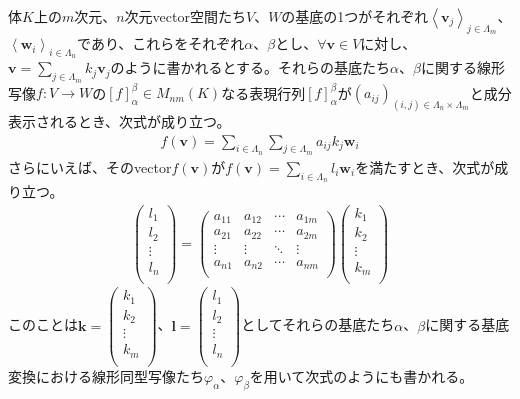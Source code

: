 \documentclass[dvipdfmx]{jsarticle}
\begin{document}
\begin{thm}
\label{2.1.5.5}
体$K$上の$m$次元、$n$次元vector空間たち$V$、$W$の基底の1つがそれぞれ$\left\langle \mathbf{v}_{j} \right\rangle_{j \in \varLambda_{m}}$、$\left\langle \mathbf{w}_{i} \right\rangle_{i \in \varLambda_{n}}$であり、これらをそれぞれ$\alpha$、$\beta$とし、$\forall\mathbf{v} \in V$に対し、$\mathbf{v} = \sum_{j \in \varLambda_{m}} {k_{j}\mathbf{v}_{j}}$のように書かれるとする。それらの基底たち$\alpha$、$\beta$に関する線形写像$f:V \rightarrow W$の$[ f]^{\beta}_{\alpha} \in M_{nm}(K)$なる表現行列$[ f]^{\beta}_{\alpha}$が$\left( a_{ij} \right)_{(i,j) \in \varLambda_{n} \times \varLambda_{m}}$と成分表示されるとき、次式が成り立つ。
\begin{align*}
f\left( \mathbf{v} \right) = \sum_{i \in \varLambda_{n}} {\sum_{j \in \varLambda_{m}} {a_{ij}k_{j}}\mathbf{w}_{i}}
\end{align*}
さらにいえば、そのvector$f\left( \mathbf{v} \right)$が$f\left( \mathbf{v} \right) = \sum_{i \in \varLambda_{n}} {l_{i}\mathbf{w}_{i}}$を満たすとき、次式が成り立つ。
\begin{align*}
\begin{pmatrix}
l_{1} \\
l_{2} \\
 \vdots \\
l_{n} \\
\end{pmatrix} = \begin{pmatrix}
a_{11} & a_{12} & \cdots & a_{1m} \\
a_{21} & a_{22} & \cdots & a_{2m} \\
 \vdots & \vdots & \ddots & \vdots \\
a_{n1} & a_{n2} & \cdots & a_{nm} \\
\end{pmatrix}\begin{pmatrix}
k_{1} \\
k_{2} \\
 \vdots \\
k_{m} \\
\end{pmatrix}
\end{align*}
このことは$\mathbf{k} = \begin{pmatrix}
k_{1} \\
k_{2} \\
 \vdots \\
k_{m} \\
\end{pmatrix}$、$\mathbf{l} = \begin{pmatrix}
l_{1} \\
l_{2} \\
 \vdots \\
l_{n} \\
\end{pmatrix}$としてそれらの基底たち$\alpha$、$\beta$に関する基底変換における線形同型写像たち$\varphi_{\alpha}$、$\varphi_{\beta}$を用いて次式のようにも書かれる。
\begin{center}
  \begin{tikzpicture}[auto] 


\end{tikzpicture}
\end{center}
\end{thm}
\end{document}
